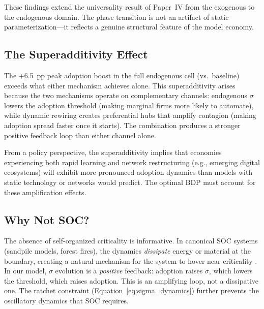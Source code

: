 \documentclass[12pt,a4paper]{article}
\begin{document}
These findings extend the universality result of Paper~IV from
the exogenous to the endogenous domain. The phase transition is
not an artifact of static parameterization---it reflects a genuine
structural feature of the model economy.

\subsection{The Superadditivity Effect}\label{sec:superadd}

The +6.5~pp peak adoption boost in the full endogenous cell (vs.\
baseline) exceeds what either mechanism achieves alone. This
superadditivity arises because the two mechanisms operate on
complementary channels: endogenous $\sigma$ lowers the adoption
threshold (making marginal firms more likely to automate), while
dynamic rewiring creates preferential hubs that amplify contagion
(making adoption spread faster once it starts). The combination
produces a stronger positive feedback loop than either channel
alone.

From a policy perspective, the superadditivity implies that
economies experiencing both rapid learning and network restructuring
(e.g., emerging digital ecosystems) will exhibit more pronounced
adoption dynamics than models with static technology or networks
would predict. The optimal BDP must account for these amplification
effects.

\subsection{Why Not SOC?}\label{sec:why_not_soc}

The absence of self-organized criticality is informative. In canonical
SOC systems (sandpile models, forest fires), the dynamics
\emph{dissipate} energy or material at the boundary, creating a
natural mechanism for the system to hover near criticality
\parencite{Bak1996}. In our model, $\sigma$ evolution is a
\emph{positive} feedback: adoption raises $\sigma$, which lowers
the threshold, which raises adoption. This is an amplifying loop,
not a dissipative one. The ratchet constraint (Equation~\ref{eq:sigma_dynamics}) further prevents the oscillatory dynamics
that SOC requires.
\end{document}
